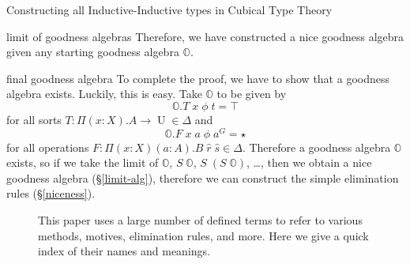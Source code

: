 \documentclass[runningheads]{llncs}
\DeclareMathOperator{\UU}{U}
\newcommand{\bbO}{\mathbb{O}}
\begin{document}
{\begin{section}{Constructing all Inductive-Inductive types in Cubical Type Theory}
\begin{subsection}{limit of goodness algebras}
Therefore, we have constructed a nice goodness algebra given any starting goodness algebra $\bbO$.

\end{subsection}
\begin{subsection}{final goodness algebra}\label{final-alg}
To complete the proof, we have to show that a goodness algebra exists. Luckily, this is easy. Take $\bbO$ to be given by \[\bbO.T\;x\;\phi\;t = \top\] for all sorts $T : \Pi(x : X).A\to\UU\in\Delta$ and \[\bbO.F\;x\;a\;\phi\;a^G = \star\] for all operations $F : \Pi(x : X)(a : A).B\;\hat{r}\;\hat{s}\in\Delta$. Therefore a goodness algebra $\bbO$ exists, so if we take the limit of $\bbO$, $S\;\bbO$, $S\;(S\;\bbO)$, \dots, then we obtain a nice goodness algebra (\S\ref{limit-alg}), therefore we can construct the simple elimination rules (\S\ref{niceness}).
\end{subsection}

\end{section}

\begin{figure}[htpb]
    \begin{flushleft}
        This paper uses a large number of defined terms to refer to various methods, motives, elimination rules, and more. Here we give a quick index of their names and meanings.
    \end{flushleft}
    

\end{figure}}
\end{document}

